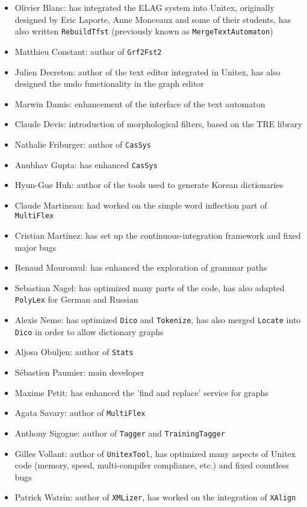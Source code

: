 \begin{itemize}
    \item Olivier Blanc: has integrated the ELAG system into Unitex, originally
    designed by Eric Laporte, Anne Monceaux and some of their students, has
    also written \verb+RebuildTfst+ (previously known as
    \verb+MergeTextAutomaton+)
    \item Matthieu Constant: author of \verb+Grf2Fst2+
    \item Julien Decreton: author of the text editor integrated in Unitex,
    has also designed the undo functionality in the graph editor
    \item Marwin Damis: enhancement of the interface of the text automaton
    \item Claude Devis: introduction of morphological filters, 
    based on the TRE library
    \item Nathalie Friburger: author of \verb+CasSys+
    \item Anubhav Gupta: has enhanced \verb+CasSys+
    \item Hyun-Gue Huh: author of the tools used to
    generate Korean dictionaries
    \item Claude Martineau: had worked on the simple word inflection part of
    \verb+MultiFlex+
    \item Cristian Martínez: has set up the continuous-integration framework and
    fixed major bugs
    \item  Renaud Mouronval: has enhanced the exploration of grammar paths
    \item Sebastian Nagel: has optimized many parts of the code, has also
    adapted \verb+PolyLex+ for German and Russian
    \item Alexis Neme: has optimized \verb+Dico+ and \verb+Tokenize+, has also
    merged \verb+Locate+ into \verb+Dico+ in order to allow dictionary graphs 
    \item Aljosa Obuljen: author of \verb+Stats+
    \item S\'ebastien Paumier: main developer
    \item Maxime Petit: has enhanced the 'find and replace' service for graphs
    \item Agata Savary: author of \verb+MultiFlex+
    \item Anthony Sigogne: author of \verb+Tagger+ and \verb+TrainingTagger+
    \item Gilles Vollant: author of \verb+UnitexTool+, has optimized many
    aspects of Unitex code (memory, speed, multi-compiler compliance, etc.) and
    fixed countless bugs
    \item Patrick Watrin: author of \verb+XMLizer+, has worked on the
    integration of \verb+XAlign+
\end{itemize}



